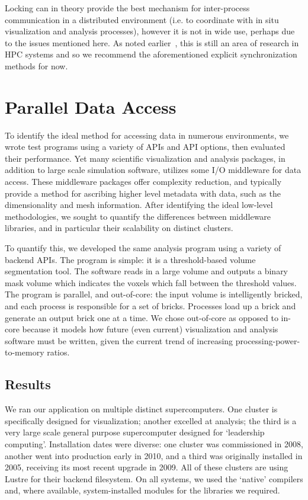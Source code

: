 Locking can in theory provide the best mechanism for inter-process
communication in a distributed environment (i.e. to coordinate with in
situ visualization and analysis processes), however it is not in wide
use, perhaps due to the issues mentioned here.  As noted
earlier~\cite{Ching:2007:Locking}, this is still an area of research
in HPC systems and so we recommend the aforementioned explicit
synchronization methods for now.

\section{Parallel Data Access}\label{sec:access}

To identify the ideal method for accessing data in numerous
environments, we wrote test programs using a variety of APIs and
API options, then evaluated their performance.  Yet many scientific
visualization and analysis packages, in addition to large scale
simulation software, utilizes some I/O middleware for data access.
These middleware packages offer complexity reduction, and typically
provide a method for ascribing higher level metadata with data, such as
the dimensionality and mesh information.  After identifying the ideal
low-level methodologies, we sought to quantify the differences between
middleware libraries, and in particular their scalability on distinct
clusters.

To quantify this, we developed the same analysis program using
a variety of backend APIs.  The program is simple: it is a
threshold-based volume segmentation tool.  The software reads in a
large volume and outputs a binary mask volume which indicates the
voxels which fall between the threshold values.  The program is
parallel, and out-of-core: the input volume is intelligently bricked,
and each process is responsible for a set of bricks.  Processes load
up a brick and generate an output brick one at a time.  We chose
out-of-core as opposed to in-core because it models how future (even
current) visualization and analysis software must be written, given the
current trend of increasing processing-power-to-memory ratios.


\subsection{Results}

We ran our application on multiple distinct supercomputers.  One
cluster is specifically designed for visualization; another excelled at
analysis; the third is a very large scale general purpose supercomputer
designed for `leadership computing'.  Installation dates were diverse:
one cluster was commissioned in 2008, another went into production
early in 2010, and a third was originally installed in 2005, receiving
its most recent upgrade in 2009.  All of these clusters are using
Lustre for their backend filesystem.  On all systems, we used the
`native' compilers and, where available, system-installed modules for
the libraries we required.


